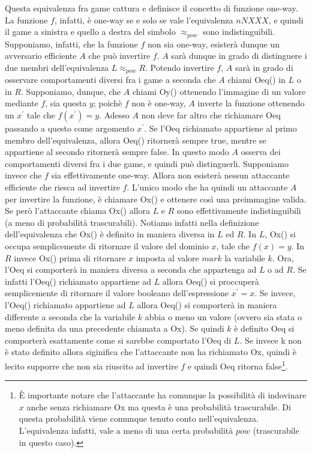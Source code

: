 \documentclass[a4paper,openright,twoside,12pt]{report}
\begin{document}
Questa equivalenza fra game cattura e definisce il concetto di funzione one-way. La funzione $f$, infatti, \`e one-way se e solo se vale l'equivalenza $nNXXX$, 
e quindi il game a sinistra e quello a destra del simbolo \textbf{$\approx _{pow}$} sono indistinguibili.
Supponiamo, infatti, che la funzione $f$ non sia one-way, esister\`a dunque un avversario efficiente $A$ 
che pu\`o invertire $f$. $A$ sar\`a dunque in grado di distinguere i due membri dell'equivalenza $L \approx_{pow} R$.
Potendo invertire $f$, $A$ sar\`a in grado di osservare comportamenti diversi fra i game a seconda che $A$ chiami Oeq() in $L$ o in $R$.
Supponiamo, dunque, che $A$ chiami Oy() ottenendo l'immagine di un valore mediante $f$, sia questa $y$; poich\`e $f$ non \`e one-way, 
$A$ inverte la funzione ottenendo un $x^{'}$ tale che $f(x^{'})= y$.
Adesso $A$ non deve far altro che richiamare Oeq passando a questo come argomento $x^{'}$. Se l'Oeq richiamato appartiene al primo membro dell'equivalenza, 
allora Oeq()  ritorner\`a sempre true, mentre se appartiene al secondo ritorner\`a sempre false. In questo modo $A$ osserva dei comportamenti diversi fra i due game, 
e quindi pu\`o distinguerli. Supponiamo invece che $f$ sia effettivamente one-way. Allora non esister\`a nessun attaccante efficiente che riesca ad invertire $f$.
L'unico modo che ha quindi un attaccante $A$ per invertire la funzione, \`e chiamare Ox() e ottenere cos\`i una preimmagine valida. 
Se però l'attaccante chiama Ox() allora $L$ e $R$ sono effettivamente indistinguibili (a meno di probabilit\`a trascurabili).
Notiamo infatti nella definizione dell'equivalenza che Ox() \`e definito in maniera diversa in $L$ ed $R$.
In $L$, Ox() si occupa semplicemente di ritornare il valore del dominio $x$, tale che $f(x)=y$. In $R$ invece Ox() prima di ritornare $x$ imposta al valore $mark$ la variabile $k$.
Ora, l'Oeq si comporter\`a in maniera diversa a seconda che appartenga ad $L$ o ad $R$.
Se infatti l'Oeq() richiamato appartiene ad $L$ allora Oeq() si proccuper\`a semplicemente di ritornare il valore booleano dell'espressione $x^{'}=x$.
Se invece, l'Oeq() richiamato appartiene ad $L$ allora Oeq() si comporter\`a in maniera differente a seconda che la variabile $k$ abbia o meno un valore 
(ovvero sia stata o meno definita da una precedente chiamata a Ox). Se quindi $k$ \`e definito Oeq si comporter\`a esattamente come si sarebbe comportato l'Oeq di $L$.
Se invece k non \`e stato definito allora siginifica che l'attaccante non ha richiamato Ox, quindi \`e lecito supporre che non sia riuscito ad invertire $f$ e quindi Oeq ritorna false\footnote{
\`E importante notare che l'attaccante ha comunque la possibilit\`a di indovinare $x$ anche senza richiamare Ox ma questa \`e una probabilit\`a trascurabile. Di questa probabilit\`a viene
comunque tenuto conto nell'equivalenza. L'equivalenza infatti, vale a meno di una certa probabilit\`a $pow$ (trascurabile in questo caso).}.
\end{document}
